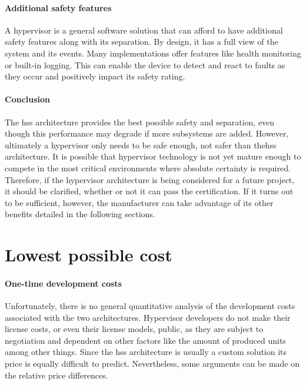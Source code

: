 \paragraph{Additional safety features}
A hypervisor is a general software solution that can afford to have additional safety features along with its separation. By design, it has a full view of the system and its events. Many implementations offer features like health monitoring or built-in logging. This can enable the device to detect and react to faults as they occur and positively impact its safety rating.

\paragraph{Conclusion}
The \acrshort{hss} architecture provides the best possible safety and separation, even though this performance may degrade if more subsystems are added. However, ultimately a hypervisor only needs to be safe enough, not safer than the\acrshort{hss} architecture. It is possible that hypervisor technology is not yet mature enough to compete in the most critical environments where absolute certainty is required. Therefore, if the hypervisor architecture is being considered for a future project, it should be clarified, whether or not it can pass the certification. If it turns out to be sufficient, however, the manufacturer can take advantage of its other benefits detailed in the following sections.



\section{Lowest possible cost}
\paragraph{One-time development costs}
Unfortunately, there is no general quantitative analysis of the development costs associated with the two architectures. Hypervisor developers do not make their license costs, or even their license models, public, as they are subject to negotiation and dependent on other factors like the amount of produced units among other things. Since the \acrshort{hss} architecture is usually a custom solution its price is equally difficult to predict. Nevertheless, some arguments can be made on the relative price differences. 

